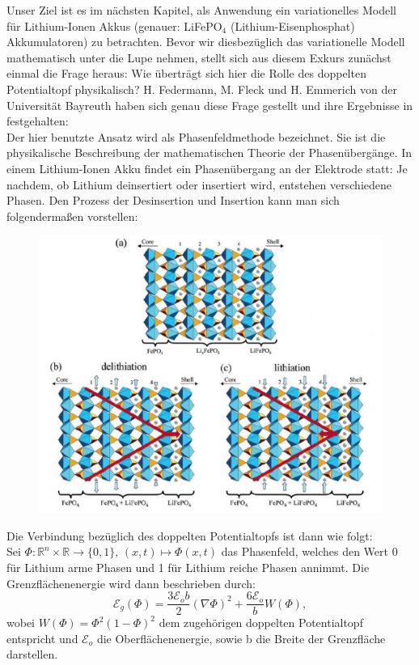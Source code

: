 Unser Ziel ist es im nächsten Kapitel, als Anwendung ein variationelles Modell für Lithium-Ionen Akkus (genauer: LiFePO\(_4\) (Lithium-Eisenphosphat) Akkumulatoren) zu betrachten. Bevor wir diesbezüglich das variationelle Modell mathematisch unter die Lupe nehmen, stellt sich aus diesem Exkurs zunächst einmal die Frage heraus: Wie überträgt sich hier die Rolle des doppelten Potentialtopf physikalisch? H. Federmann, M. Fleck und H. Emmerich von der Universität Bayreuth haben sich genau diese Frage gestellt und ihre Ergebnisse in \cite{LiFedermann} festgehalten:\\
Der hier benutzte Ansatz wird als Phasenfeldmethode bezeichnet. Sie ist die physikalische Beschreibung der mathematischen Theorie der Phasenübergänge. In einem Lithium-Ionen Akku findet ein Phasenübergang an der Elektrode statt: Je nachdem, ob Lithium deinsertiert oder insertiert wird, entstehen verschiedene Phasen. Den Prozess der Desinsertion und Insertion kann man sich folgendermaßen vorstellen:
\newpage
\begin{figure}[label={fig:lidesint}, caption={Der Prozess der Lithium Desinsertion/Insertion graphisch dargestellt \cite{LiFedermann}}]
    \includegraphics[scale=0.5]{figures/LithiumAkkus.pdf}
\end{figure}

Die Verbindung bezüglich des doppelten Potentialtopfs ist dann wie folgt:\\
Sei \(\Phi : \mathbb{R}^n \times \mathbb{R} \to \{0,1\}, \, (x,t) \mapsto \Phi(x,t)\) das Phasenfeld, welches den Wert 0 für Lithium arme Phasen und 1 für Lithium reiche Phasen annimmt. Die Grenzflächenenergie wird dann beschrieben durch:
\begin{equation}
    \mathcal{E}_g (\Phi) = \frac{3 \mathcal{E}_o b}{2} (\nabla \Phi)^2 + \frac{6 \mathcal{E}_o}{b} W(\Phi),
\end{equation}
wobei \(W(\Phi) = \Phi^2(1-\Phi)^2\) dem zugehörigen doppelten Potentialtopf entspricht und \(\mathcal{E}_o\) die Oberflächenenergie, sowie b die Breite der Grenzfläche darstellen.